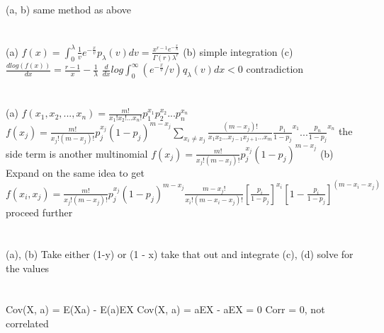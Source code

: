 \documentclass{report}
\begin{document}
\section{}
(a, b) same method as above
\newline
\section{}
(a) $f(x) = \int_{0}^{\lambda}\frac{1}{v}e^{-\frac{x}{v}}p_{\lambda}(v)dv = \frac{x^{r - 1}e^{-\frac{x}{\lambda}}}{\Gamma(r)\lambda^r}$
\newline
(b) simple integration
\newline
(c) $\frac{d log(f(x))}{dx} = \frac{r - 1}{x} - \frac{1}{\lambda}$
\newline
${\frac{d}{dx} log\int_{0}^{\infty}}(e^{-\frac{x}{v}}/v)q_{\lambda}(v){dx} < 0$ contradiction
\newline
\section{}
(a) $f(x_1, x_2, ... , x_n) = \frac{m!}{x_1!x_2!...x_n!}p_1^{x_1}p_2^{x_2} ... p_n^{x_n}$
\newline
$f(x_j) = \frac{m!}{x_j!(m - x_j)!}p_j^{x_j}(1 - p_j)^{m - x_j}\sum_{x_i \ne x_j} \frac{(m - x_j)!}{x_1x_2 ... x_{j-1}x_{j+1} ... x_m}\frac{p_1}{1 - p_j}^{x_1} ... \frac{p_n}{1 - p_j}^{x_n}$ the side term is another multinomial
\newline
$f(x_j) = \frac{m!}{x_j!(m - x_j)!}p_j^{x_j}(1 - p_j)^{m - x_j}$
\newline
(b) Expand on the same idea to get
\newline
$f(x_i, x_j) = \frac{m!}{x_j!(m - x_j)!}p_j^{x_j}(1 - p_j)^{m - x_j} \frac{m - x_j!}{x_i!(m - x_i - x_j)!}\left[\frac{p_i}{1 - p_j}\right]^{x_i}\left[1 - \frac{p_i}{1 - p_j}\right]^{(m - x_i - x_j)}$
\newline
proceed further
\newline
\section{}
(a), (b) Take either (1-y) or (1 - x) take that out and integrate
\newline
(c), (d) solve for the values
\newline
\section{}
Cov(X, a) = E(Xa) - E(a)EX
\newline
Cov(X, a) = aEX - aEX = 0
\newline
Corr = 0, not correlated
\newline
\end{document}
